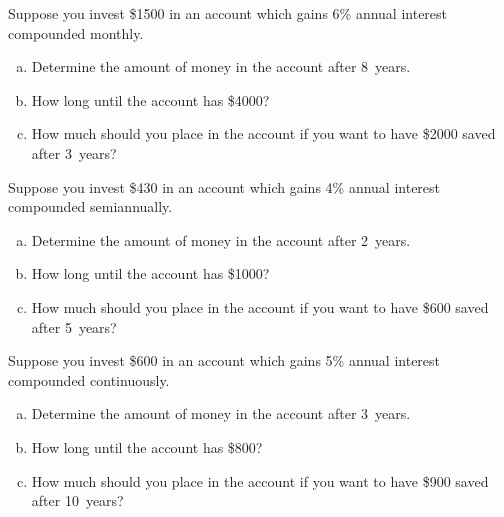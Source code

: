 \documentclass[11pt,letterpaper]{article}
\begin{document}

 Suppose you invest \$1500 in an account which gains 6\% annual interest compounded monthly. 
        \begin{enumerate}[(a)]
        \item Determine the amount of money in the account after 8~years.
        \item How long until the account has \$4000?
        \item How much should you place in the account if you want to have \$2000 saved after 3~years?
        \end{enumerate} \pspace





\newpage





 Suppose you invest \$430 in an account which gains 4\% annual interest compounded semiannually. 
        \begin{enumerate}[(a)]
        \item Determine the amount of money in the account after 2~years.
        \item How long until the account has \$1000?
        \item How much should you place in the account if you want to have \$600 saved after 5~years?
        \end{enumerate} \pspace





\newpage





 Suppose you invest \$600 in an account which gains 5\% annual interest compounded continuously. 
        \begin{enumerate}[(a)]
        \item Determine the amount of money in the account after 3~years.
        \item How long until the account has \$800?
        \item How much should you place in the account if you want to have \$900 saved after 10~years?
        \end{enumerate} \pspace
\end{document}

